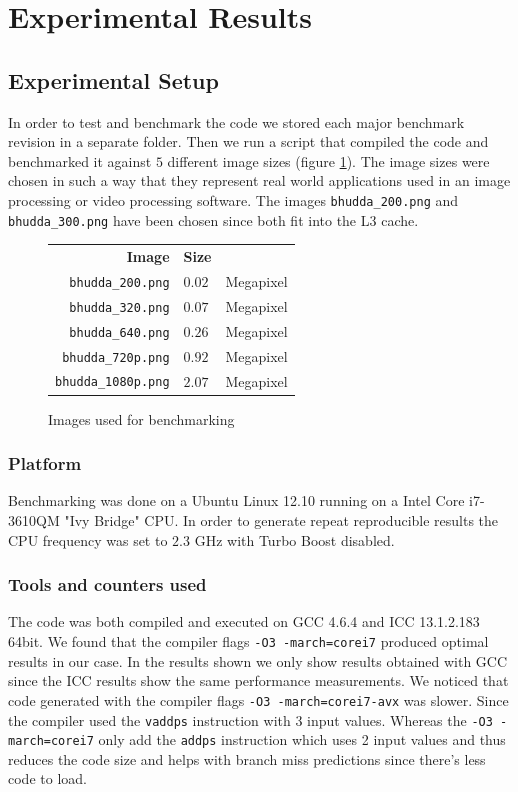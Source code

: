 \section{Experimental Results}\label{sec:exp}
\subsection{Experimental Setup}\label{sec:exp_setup8}
In order to test and benchmark the code we stored each major benchmark revision in a separate folder. Then we run a script that compiled the code and benchmarked it against $5$ different image sizes (figure \ref{tab:images}). The image sizes were chosen in such a way that they represent real world applications used in an image processing or video processing software. The images \texttt{bhudda\_200.png} and \texttt{bhudda\_300.png} have been chosen since both fit into the L3 cache. 
\begin{figure}
\centering
\begin{tabular}{rll}
\textbf{Image} & \textbf{Size}\\
\texttt{bhudda\_200.png} & $0.02$ & Megapixel\\
\texttt{bhudda\_320.png} & $0.07$ & Megapixel\\
\texttt{bhudda\_640.png} & $0.26$ & Megapixel\\
\texttt{bhudda\_720p.png} & $0.92$ & Megapixel\\
\texttt{bhudda\_1080p.png} & $2.07$ & Megapixel\\
\end{tabular}
\caption{Images used for benchmarking}
\label{tab:images}
\end{figure}

\subsubsection{Platform}
Benchmarking was done on a Ubuntu Linux 12.10 running on a Intel Core i7-3610QM "Ivy Bridge" CPU. In order to generate repeat reproducible results the CPU frequency was set to $2.3$ GHz with Turbo Boost disabled.
\subsubsection{Tools and counters used}
The code was both compiled and executed on GCC 4.6.4 and ICC 13.1.2.183 64bit. We found that the compiler flags \lstinline{-O3 -march=corei7} produced optimal results in our case. In the results shown we only show results obtained with GCC since the ICC results show the same performance measurements. We noticed that code generated with the compiler flags \lstinline{-O3 -march=corei7-avx} was slower. Since the compiler used the \lstinline{vaddps} instruction with 3 input values. Whereas the \lstinline{-O3 -march=corei7} only add the \lstinline{addps} instruction which uses 2 input values and thus reduces the code size and helps with branch miss predictions since there's less code to load. 

